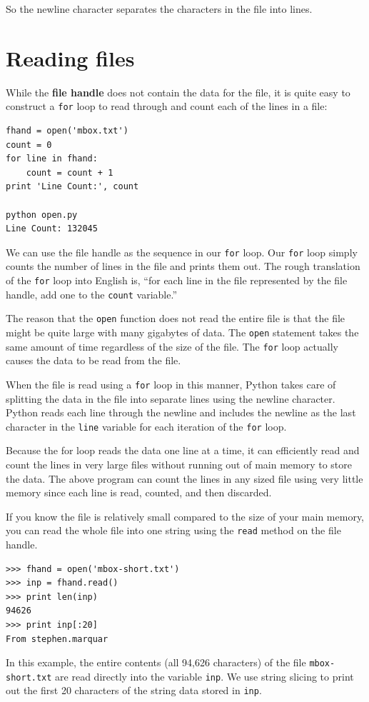 \documentclass[10pt]{book}
\begin{document}
So the newline character separates the characters 
in the file into lines.

\section{Reading files}

While the {\bf file handle} does not contain the data for the file,
it is quite easy to construct a {\tt for} loop to read through 
and count each of the lines in a file:

\beforeverb
\begin{verbatim}
fhand = open('mbox.txt')
count = 0
for line in fhand:
    count = count + 1
print 'Line Count:', count

python open.py 
Line Count: 132045
\end{verbatim}
\afterverb
%
We can use the file handle as the sequence in our {\tt for} loop.  
Our {\tt for} loop simply counts the number of lines in the 
file and prints them out.  The rough translation of the {\tt for}
loop into English is, ``for each line in the file represented by the file
handle, add one to the {\tt count} variable.''

The reason that the {\tt open} function does not read the entire file
is that the file might be quite large with many gigabytes of data.
The {\tt open} statement takes the same amount of time regardless of the
size of the file.  The {\tt for} loop actually causes the data to be 
read from the file.

When the file is read using a {\tt for} loop in this manner, Python
takes care of splitting the data in the file into separate lines using
the newline character.  Python reads each line through 
the newline and includes
the newline as the last character in the {\tt line} variable for each 
iteration of the {\tt for} loop.

Because the for loop reads the data one line at a time, it can efficiently
read and count the lines in very large files without running 
out of main memory to store the data.  The above program can 
count the lines in any sized file using very little memory since 
each line is read, counted, and then discarded.

If you know the file is relatively small compared to the size of 
your main memory, you can read the whole file into one string
using the {\tt read} method on the file handle.

\beforeverb
\begin{verbatim}
>>> fhand = open('mbox-short.txt')
>>> inp = fhand.read()
>>> print len(inp)
94626
>>> print inp[:20]
From stephen.marquar
\end{verbatim}
\afterverb
%
In this example, the entire contents (all 94,626 characters) 
of the file {\tt mbox-short.txt} are read directly into the 
variable {\tt inp}.  We use string slicing to print out the first
20 characters of the string data stored in {\tt inp}.
\end{document}
